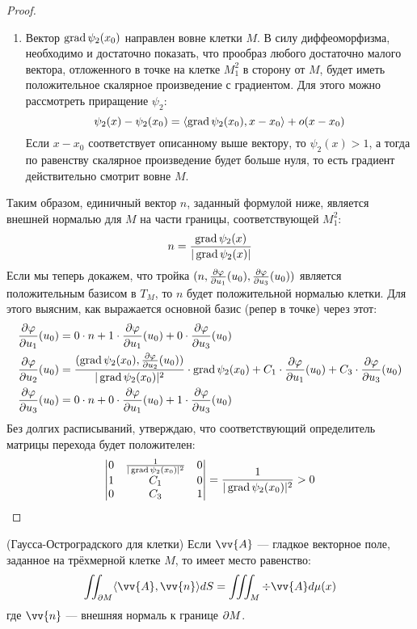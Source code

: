 \begin{proof}
\begin{enumerate}
		\item Вектор $\operatorname{grad} \psi_2(x_0)$ направлен вовне клетки $M$. В силу диффеоморфизма, необходимо и достаточно показать, что прообраз любого достаточно малого вектора, отложенного в точке на клетке $M_1^2$ в сторону от $M$, будет иметь положительное скалярное произведение с градиентом. Для этого можно рассмотреть приращение $\psi_2$:
		\[
			\psi_2(x) - \psi_2(x_0) = \left\langle\operatorname{grad} \psi_2(x_0), x - x_0\right\rangle + o(x - x_0)
 		\]
 		Если $x - x_0$ соответствует описанному выше вектору, то $\psi_2(x) > 1$, а тогда по равенству скалярное произведение будет больше нуля, то есть градиент действительно смотрит вовне $M$.
	\end{enumerate}
	Таким образом, единичный вектор $n$, заданный формулой ниже, является внешней нормалью для $M$ на части границы, соответствующей $M_1^2$:
	\[
		n = \frac{\operatorname{grad} \psi_2(x)}{|\operatorname{grad} \psi_2(x)|}
	\]
	Если мы теперь докажем, что тройка $(n, \frac{\partial \varphi}{\partial u_1}(u_0), \frac{\partial \varphi}{\partial u_3}(u_0))$ является положительным базисом в $T_M$, то $n$ будет положительной нормалью клетки. Для этого выясним, как выражается основной базис (репер в точке) через этот:
	\begin{align*}
		&{\frac{\partial \varphi}{\partial u_1}(u_0) = 0 \cdot n + 1 \cdot \frac{\partial \varphi}{\partial u_1}(u_0) + 0 \cdot \frac{\partial \varphi}{\partial u_3}(u_0)}
		\\
		&{\frac{\partial \varphi}{\partial u_2}(u_0) = \frac{(\operatorname{grad} \psi_2(x_0), \frac{\partial \varphi}{\partial u_2}(u_0))}{|\operatorname{grad} \psi_2(x_0)|^2} \cdot \operatorname{grad} \psi_2(x_0)} + C_1 \cdot \frac{\partial \varphi}{\partial u_1}(u_0) + C_3 \cdot \frac{\partial \varphi}{\partial u_3}(u_0)
		\\
		&{\frac{\partial \varphi}{\partial u_3}(u_0) = 0 \cdot n + 0 \cdot \frac{\partial \varphi}{\partial u_1}(u_0) + 1 \cdot \frac{\partial \varphi}{\partial u_3}(u_0)}
	\end{align*}
	Без долгих расписываний, утверждаю, что соответствующий определитель матрицы перехода будет положителен:
	\[
		\begin{vmatrix}
			0 & \frac{1}{|\operatorname{grad} \psi_2(x_0)|^2} & 0
			\\
			1 & C_1 & 0
			\\
			0 & C_3 & 1
		\end{vmatrix} = \frac{1}{|\operatorname{grad} \psi_2(x_0)|^2} > 0
	\]
\end{proof}

\begin{theorem} (Гаусса-Остроградского для клетки)
	Если $\vv{A}$ --- гладкое векторное поле, заданное на трёхмерной клетке $M$, то имеет место равенство:
	\[
		\iint_{\vdelta M} \ntbr{\vv{A}, \vv{n}}dS = \iiint_M \div \vv{A} d\mu(x)
	\]
	где $\vv{n}$ --- внешняя нормаль к границе $\partial M$.
\end{theorem}

